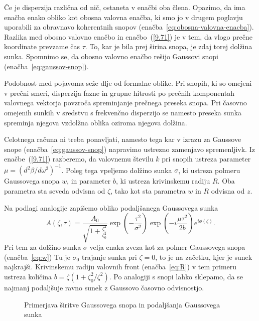 Če je disperzija različna od nič, ostaneta v enačbi oba člena. Opazimo, da
ima enačba enako obliko kot obosna valovna enačba, ki smo jo v
drugem poglavju uporabili za obravnavo koherentnih 
snopov (enačba~\ref{eq:obosna-valovna-enacba}). 
Razlika med obosno valovno enačbo in enačbo~(\ref{9.71}) je v tem, da vlogo
prečne koordinate prevzame čas $\tau$. To, kar je bila prej širina snopa, 
je zdaj torej dolžina sunka. Spomnimo se, da 
obosno valovno enačbo rešijo Gaussovi snopi (enačba~\ref{eq:gaussov-snop}). 

\begin{remark}
Podobnost med pojavoma seže dlje od formalne oblike. Pri snopih, ki so omejeni 
v prečni smeri, disperzija fazne in grupne hitrosti po prečnih komponentah valovnega
vektorja povzroča spreminjanje prečnega preseka snopa. Pri časovno
omejenih sunkih v sredstvu s frekvenčno disperzijo se namesto preseka sunka
spreminja njegova vzdolžna oblika oziroma njegova dolžina.
\end{remark}

Celotnega računa
ni treba ponavljati, namesto tega kar v izrazu za Gaussove snope 
(enačba~\ref{eq:gaussov-snop}) napravimo ustrezno zamenjavo spremenljivk. 
Iz enačbe~(\ref{9.71}) razberemo, da valovnemu številu $k$ pri snopih  
ustreza parameter $\mu=(d^{2}\beta/d\omega^{2})^{-1}$. Poleg tega vpeljemo
dolžino sunka $\sigma$, ki ustreza polmeru Gaussovega snopa $w$, in parameter
$b$, ki ustreza krivinskemu radiju $R$. Oba parametra sta seveda odvisna od $\zeta$, 
tako kot sta parametra $w$ in $R$ odvisna od $z$. 

Na podlagi analogije zapišemo obliko podaljšanega Gaussovega sunka
\begin{equation}
A\left(\zeta,\tau\right)=\frac{A_{0}}{\sqrt{1+\frac{\zeta^{2}
}{\zeta_{0}^{2}}}}\exp\left(-\frac{\tau^{2}}{\sigma^{2}}\right)\exp
\left(-i\frac{\mu\tau^{2}}{2b}\right)e^{i\phi\left(\zeta\right)}.
\label{9.72}
\end{equation}
Pri tem za dolžino sunka $\sigma$ velja enaka zveza kot za polmer 
Gaussovega snopa (enačba~\ref{eq:w})
Tu je $\sigma_{0}$ trajanje sunka pri $\zeta=0$, to je na začetku,
kjer je sunek najkrajši. Krivinskemu radiju valovnih front (enačba~\ref{eq:R}) v tem primeru
ustreza količina $b=\zeta\left(1+\zeta_{0}^{2}/\zeta^{2}\right)$.
Po analogiji s snopi lahko sklepamo, da se najmanj 
podaljšuje ravno sunek z Gaussovo časovno odvisnostjo. 
\begin{figure}[h]
\centering
\def\svgwidth{110truemm} 

\caption{Primerjava širitve Gaussovega snopa in podaljšanja Gaussovega sunka}
\label{fig:Gausstau}
\end{figure}

